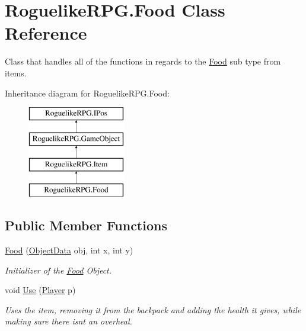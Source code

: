 \hypertarget{class_roguelike_r_p_g_1_1_food}{}\section{Roguelike\+R\+P\+G.\+Food Class Reference}
\label{class_roguelike_r_p_g_1_1_food}


Class that handles all of the functions in regards to the \mbox{\hyperlink{class_roguelike_r_p_g_1_1_food}{Food}} sub type from items.  


Inheritance diagram for Roguelike\+R\+P\+G.\+Food\+:\begin{figure}[H]
\begin{center}
\leavevmode
\includegraphics[height=4.000000cm]{class_roguelike_r_p_g_1_1_food}
\end{center}
\end{figure}
\subsection*{Public Member Functions}
\begin{DoxyCompactItemize}
\item 
\mbox{\hyperlink{class_roguelike_r_p_g_1_1_food_adab425fc62ac669c0c0155f1fa109dab}{Food}} (\mbox{\hyperlink{struct_roguelike_r_p_g_1_1_object_data}{Object\+Data}} obj, int x, int y)
\begin{DoxyCompactList}\small\item\em Initializer of the \mbox{\hyperlink{class_roguelike_r_p_g_1_1_food}{Food}} Object. \end{DoxyCompactList}\item 
void \mbox{\hyperlink{class_roguelike_r_p_g_1_1_food_a422486d8f892efec7859a7a62fa39af0}{Use}} (\mbox{\hyperlink{class_roguelike_r_p_g_1_1_player}{Player}} p)
\begin{DoxyCompactList}\small\item\em Uses the item, removing it from the backpack and adding the health it gives, while making sure there isnt an overheal. \end{DoxyCompactList}\end{DoxyCompactItemize}
